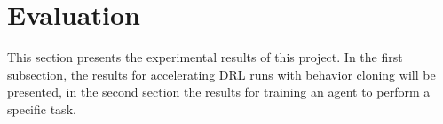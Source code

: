\chapter{Evaluation}
This section presents the experimental results of this project. In the first subsection, the results for accelerating DRL runs with behavior cloning will be presented, in the second section the results for training an agent to perform a specific task.








